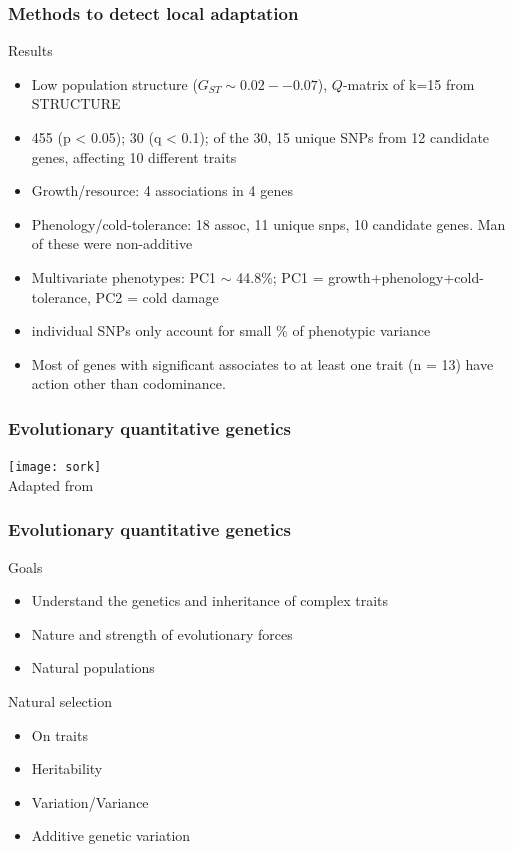 \begin{frame}
\frametitle{Methods to detect local adaptation}
\begin{block}{Results}
\begin{itemize}
\item{Low population structure ($G_{ST} \sim 0.02--0.07$), $Q$-matrix of k=15
from STRUCTURE}
\item{455 (p < 0.05); 30 (q < 0.1); of the 30, 15 unique SNPs from 12
candidate genes, affecting 10 different traits}
\item{Growth/resource: 4 associations in 4 genes}
\item{Phenology/cold-tolerance: 18 assoc, 11 unique snps, 10 candidate genes. 
Man of these were non-additive}
\item{Multivariate phenotypes: PC1 $\sim$ 44.8\%;  PC1 =
growth+phenology+cold-tolerance, PC2 = cold damage}
\item{individual SNPs only account for small \% of phenotypic variance}
\item{Most of genes with significant associates to at least one trait (n =
13) have action other than codominance.}
\end{itemize}
\end{block}
\end{frame}




\begin{frame}
\frametitle{Evolutionary quantitative genetics}
\begin{block}{}
\centering
\texttt{[image: sork]}\\
\tiny
Adapted from \citet[Figure 1]{Sork:2013tb}
\end{block}{}
\end{frame}

\begin{frame}
\frametitle{Evolutionary quantitative genetics}
\begin{block}{Goals}
\begin{itemize}
\item{Understand the genetics and inheritance of complex traits}
\item{Nature and strength of evolutionary forces}
\item{Natural populations}
\end{itemize}
\end{block}

\begin{block}{Natural selection}
\begin{itemize}
\item{On traits}
\item{Heritability}
\item{Variation/Variance}
\item{Additive genetic variation}
\end{itemize}
\end{block}
\tiny
\citet{Walsh:2008}
\end{frame}

